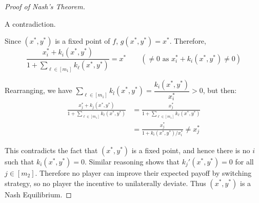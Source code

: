 \begin{proof}[Proof of Nash's Theorem]
\begin{subproof}
			A contradiction.
		\end{subproof}

		Since $(x^*,y^*)$ is a fixed point of $f$, $g(x^*,y^*) = x^*$.
		Therefore,
		\begin{equation*}
			\frac{x^*_i + k_i(x^*, y^*)}{1 + \sum_{\ell \in [m_1]} k_\ell (x^*,
		y^*)} = x^* \qquad (\neq 0 \text{ as $x^*_i + k_i(x^*, y^*) \neq 0$})
		\end{equation*}

		Rearranging, we have $\sum_{\ell \in [m_1]} k_l(x^*, y^*) =
		\dfrac{k_i(x^*, y^*)}{x^*_i} > 0$, but then:
		\begin{equation*}
			\begin{split}
				\frac{x^*_j + k_j(x^*,y^*)}{1 + \sum_{\ell \in [m_1]} k_\ell
				(x^*, y^*)} & = \frac{x^*_j}{1 + \sum_{\ell \in [m_1]} k_\ell
				(x^*, y^*)} \\
				& = \frac{x^*_j}{1 + k_i(x^*,y^*) / x^*_i} \neq x^*_j
			\end{split}
		\end{equation*}

		This contradicts the fact that $(x^*,y^*)$ is a fixed point, and hence
		there is no $i$ such that $k_i(x^*, y^*) = 0$. Similar reasoning shows
		that $k_j'(x^*,y^*) = 0$ for all $j \in [m_2]$. Therefore no player can
		improve their expected payoff by switching strategy, so no player the
		incentive to unilaterally deviate. Thus $(x^*,y^*)$ is a Nash
		Equilibrium.
	\end{proof}
